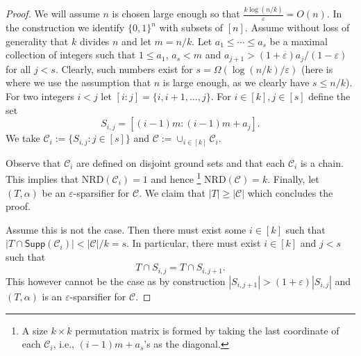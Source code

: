 \documentclass{article}
\renewcommand{\epsilon}{\varepsilon}
\DeclareMathOperator{\high}{\mathrm{high}}
\newcommand{\Supp}{\mathsf{Supp}}
\newcommand{\<}{\langle}
\renewcommand{\>}{\rangle}
\newcommand{\calC}{\mathcal{C}}
\newcommand{\ignore}[1]{{}}
\begin{document}
\begin{proof}
We will assume $n$ is chosen large enough so that $\frac{k \log(n/k)}{\varepsilon} = O(n)$.
In the construction we identify $\{0,1\}^n$ with subsets of $[n]$.
Assume without loss of generality that $k$ divides $n$ and let $m=n/k$. Let $a_1 \le \cdots \le a_s$ be a maximal collection of integers such that $1 \le a_1$, $a_s < m$ and $a_{j+1} > (1+\varepsilon) a_j/(1-\epsilon)$ for all $j<s$. Clearly, such numbers exist for $s=\Omega(\log (n/k)/\varepsilon)$ (here is where we use the assumption that $n$ is large enough, as we clearly have $s \le n/k$). For two integers $i<j$ let $[i:j]=\{i,i+1,\ldots,j\}$. For $i \in [k], j \in [s]$ define the set
$$
S_{i,j} = [(i-1)m:(i-1)m+a_j].
$$
We take $\calC_i := \{S_{i,j}:  j \in [s]\}$ and $\calC := \cup_{i \in [k]} \calC_i$.

Observe that $\calC_i$ are defined on disjoint ground sets and that each $\calC_i$ is a chain. This implies that $\mathrm{NRD}(\calC_i)=1$ and hence \footnote{A size $k \times k$ permutation matrix is formed by taking the last coordinate of each $\calC_i$, i.e., $(i-1)m + a_s$'s as the diagonal.} $\mathrm{NRD}(\calC)=k$. Finally, let $(T,\alpha)$ be an $\varepsilon$-sparsifier for $\calC$. We claim that $|T| \ge |\calC|$ which concludes the proof.

Assume this is not the case. Then there must exist some $i \in [k]$ such that $|T \cap \Supp (\calC_i)| < |\calC| / k = s$. In particular, there must exist $i \in [k]$ and $j<s$ such that 
$$
T \cap S_{i,j} = T \cap S_{i,j+1}.
$$
This however cannot be the case as by construction $|S_{i,j+1}| > (1+\varepsilon) |S_{i,j}|$ and $(T,\alpha)$ is an $\varepsilon$-sparsifier for $\calC$.


\end{proof}


\ignore{
\begin{remark}[Where $\log\log n$ appears]
The $\log\log n$ dependence enters through $\log R$ in (i) the target failure probability
per round, and (ii) the choice of $w_{\high}$ and $w_{\min}$ to make union bounds hold uniformly
over all $R=\Theta(\log n)$ rounds when $k$ is small.
This does not affect the main point that the dependence on $n$ is a single $\log n$ factor.
\end{remark}}



\newpage




\appendix
\end{document}
